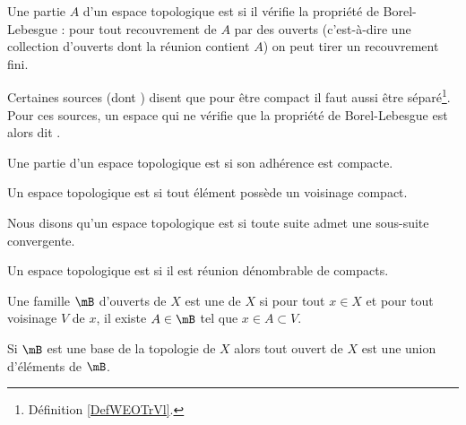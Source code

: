 \begin{definition}  \label{DefJJVsEqs}
  Une partie $A$ d'un espace topologique est  si il vérifie la propriété de Borel-Lebesgue : pour tout recouvrement de $A$ par des ouverts (c'est-à-dire une collection d'ouverts dont la réunion contient $A$) on peut tirer un recouvrement fini.
\end{definition}
\begin{remark}
    Certaines sources (dont ) disent que pour être compact il faut aussi être séparé\footnote{Définition \ref{DefWEOTrVl}.}. Pour ces sources, un espace qui ne vérifie que la propriété de Borel-Lebesgue est alors dit .
\end{remark}

\begin{definition}
    Une partie d'un espace topologique est  si son adhérence est compacte.
\end{definition}

\begin{definition}  \label{DefEIBYooAWoESf}
    Un espace topologique est  si tout élément possède un voisinage compact.
\end{definition}

\begin{definition}
    Nous disons qu'un espace topologique est  si toute suite admet une sous-suite convergente.
\end{definition}

\begin{definition}      \label{DefFCGBooLpnSAK}
    Un espace topologique est  si il est réunion dénombrable de compacts.
\end{definition}

\begin{definition}   \label{DefQELfbBEyiB}
    Une famille \( \mB\) d'ouverts de \( X\) est une  de \( X\) si pour tout \( x\in X\) et pour tout voisinage \( V\) de \( x\), il existe \( A\in \mB\) tel que \( x\in A\subset V\).
\end{definition}

\begin{proposition} \label{PropMMKBjgY}
    Si \( \mB\) est une base de la topologie de \( X\) alors tout ouvert de \( X\) est une union d'éléments de \( \mB\).
\end{proposition}

